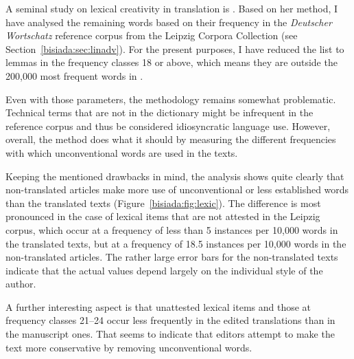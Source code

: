 \documentclass[output=paper]{LSP/langsci}
\begin{document}
\newpage 
A seminal study on lexical creativity in translation is \textcite{kenny01}. Based on her method, I have analysed the remaining words based on their frequency in the \emph{Deutscher Wortschatz} reference corpus \parencite{quaetal13} from the Leipzig Corpora Collection (see Section~\ref{bisiada:sec:linadv}). For the present purposes, I have reduced the list to lemmas in the frequency classes 18 or above, which means they are outside the 200,000 most frequent words in .

Even with those parameters, the methodology remains somewhat problematic. Technical terms that are not in the dictionary might be infrequent in the reference corpus and thus be considered idiosyncratic language use. However, overall, the method does what it should by measuring the different frequencies with which unconventional words are used in the texts.

Keeping the mentioned drawbacks in mind, the analysis shows quite clearly that non-translated articles make more use of unconventional or less established words than the translated texts (Figure~\ref{bisiada:fig:lexic}). The difference is most pronounced in the case of lexical items that are not attested in the Leipzig corpus, which occur at a frequency of less than 5 instances per 10,000 words in the translated texts, but at a frequency of 18.5 instances per 10,000 words in the non-translated articles. The rather large error bars for the non-translated texts indicate that the actual values depend largely on the individual style of the author.

A further interesting aspect is that unattested lexical items and those at frequency classes 21--24 occur less frequently in the edited translations than in the manuscript ones. That seems to indicate that editors attempt to make the text more conservative by removing unconventional words.
\end{document}
